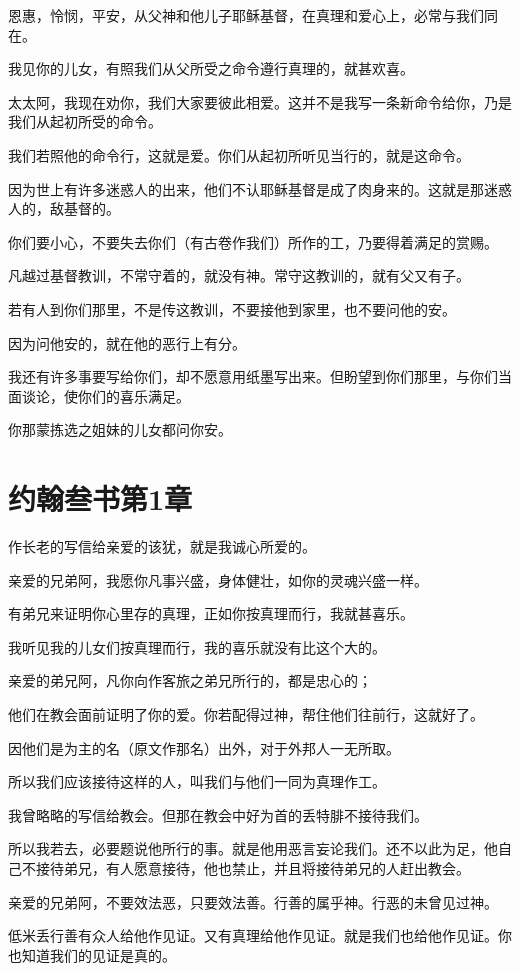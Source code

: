 \documentclass[12pt,oneside]{book}
\begin{document}
恩惠，怜悯，平安，从父神和他儿子耶稣基督，在真理和爱心上，必常与我们同在。

我见你的儿女，有照我们从父所受之命令遵行真理的，就甚欢喜。

太太阿，我现在劝你，我们大家要彼此相爱。这并不是我写一条新命令给你，乃是我们从起初所受的命令。

我们若照他的命令行，这就是爱。你们从起初所听见当行的，就是这命令。

因为世上有许多迷惑人的出来，他们不认耶稣基督是成了肉身来的。这就是那迷惑人的，敌基督的。

你们要小心，不要失去你们（有古卷作我们）所作的工，乃要得着满足的赏赐。

凡越过基督教训，不常守着的，就没有神。常守这教训的，就有父又有子。

若有人到你们那里，不是传这教训，不要接他到家里，也不要问他的安。

因为问他安的，就在他的恶行上有分。

我还有许多事要写给你们，却不愿意用纸墨写出来。但盼望到你们那里，与你们当面谈论，使你们的喜乐满足。

你那蒙拣选之姐妹的儿女都问你安。

\chapter{约翰叁书第1章}
作长老的写信给亲爱的该犹，就是我诚心所爱的。

亲爱的兄弟阿，我愿你凡事兴盛，身体健壮，如你的灵魂兴盛一样。

有弟兄来证明你心里存的真理，正如你按真理而行，我就甚喜乐。

我听见我的儿女们按真理而行，我的喜乐就没有比这个大的。

亲爱的弟兄阿，凡你向作客旅之弟兄所行的，都是忠心的；

他们在教会面前证明了你的爱。你若配得过神，帮住他们往前行，这就好了。

因他们是为主的名（原文作那名）出外，对于外邦人一无所取。

所以我们应该接待这样的人，叫我们与他们一同为真理作工。

我曾略略的写信给教会。但那在教会中好为首的丢特腓不接待我们。

所以我若去，必要题说他所行的事。就是他用恶言妄论我们。还不以此为足，他自己不接待弟兄，有人愿意接待，他也禁止，并且将接待弟兄的人赶出教会。

亲爱的兄弟阿，不要效法恶，只要效法善。行善的属乎神。行恶的未曾见过神。

低米丢行善有众人给他作见证。又有真理给他作见证。就是我们也给他作见证。你也知道我们的见证是真的。
\end{document}
